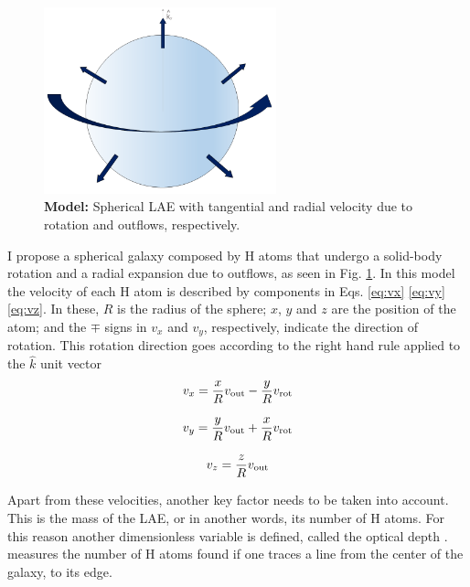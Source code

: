 \begin{figure}[h!]
	\begin{center}
		\includegraphics[width=0.6\textwidth]{./figures/chapter2/model}
	\end{center}
	\caption{\textbf{Model:} Spherical LAE with tangential and radial velocity due to rotation and outflows, respectively.
		\label{fig:model}}
\end{figure}

I propose a spherical galaxy composed by H atoms that undergo a solid-body rotation and a radial expansion due to outflows, as seen in Fig. \ref{fig:model}. In this model the velocity of each H atom is described by components in Eqs. \ref{eq:vx} \ref{eq:vy} \ref{eq:vz}. In these, $R$ is the radius of the sphere; $x$, $y$ and $z$ are the position of the atom; and the $\mp$ signs in $v_x$ and $v_y$, respectively, indicate the direction of rotation. This rotation direction goes according to the right hand rule applied to the  $\hat{k}$ unit vector \\

\begin{equation}
v_{x}=\frac{x}{R}v_{\rm out}-\frac{y}{R}v_{\rm rot} 
\label{eq:vx}
\end{equation}

\begin{equation}
v_{y}=\frac{y}{R}v_{\rm out}+\frac{x}{R}v_{\rm rot} 
\label{eq:vy}
\end{equation}

\begin{equation}
v_{z}=\frac{z}{R}v_{\rm out}
\label{eq:vz}
\end{equation}

Apart from these velocities, another key factor needs to be taken into account. This is the mass of the LAE, or in another words, its number of H atoms. For this reason another dimensionless variable is defined, called the optical depth \tauh. \tauh measures the number of H atoms found if one traces a line from the center of the galaxy, to its edge.\\

